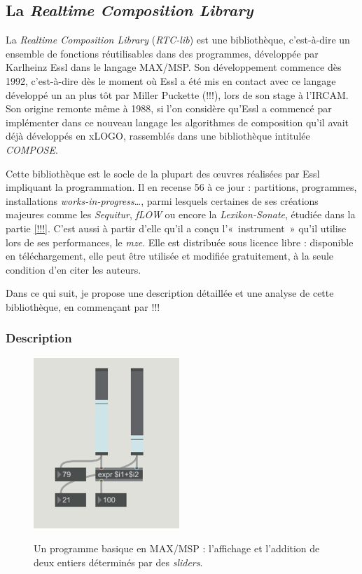 \documentclass[a4paper,12pt]{article}
\newcommand{\guill}[1]{«~#1~»}
\newcommand{\maze}[0]{\emph{m\symbol{64}ze\textdegree2}}
\begin{document}
\subsection{La \emph{Realtime Composition Library}}

La \emph{Realtime Composition Library} (\emph{RTC-lib}) est une bibliothèque, c'est-à-dire un ensemble de fonctions réutilisables dans des programmes, développée par Karlheinz Essl dans le langage MAX/MSP. Son développement commence dès 1992, c'est-à-dire dès le moment où Essl a été mis en contact avec ce langage développé un an plus tôt par Miller Puckette (!!!), lors de son stage à l'IRCAM. Son origine remonte même à 1988, si l'on considère qu'Essl a commencé par implémenter dans ce nouveau langage les algorithmes de composition qu'il avait déjà développés en xLOGO, rassemblés dans une bibliothèque intitulée \emph{COMPOSE}.

Cette bibliothèque est le socle de la plupart des œuvres réalisées par Essl impliquant la programmation. Il en recense 56 à ce jour : partitions, programmes, installations \emph{works-in-progress}\dots, parmi lesquels certaines de ses créations majeures comme les \emph{Sequitur}, \emph{fLOW} ou encore la \emph{Lexikon-Sonate}, étudiée dans la partie \ref{!!!}. C'est aussi à partir d'elle qu'il a conçu l'\guill{instrument} qu'il utilise lors de ses performances, le \maze. Elle est distribuée sous licence libre : disponible en téléchargement, elle peut être utilisée et modifiée gratuitement, à la seule condition d'en citer les auteurs.

Dans ce qui suit, je propose une description détaillée et une analyse de cette bibliothèque, en commençant par !!!

\subsubsection{Description}

\begin{figure}[h!]
\centering
\includegraphics[width=5.5cm]{images/MAXbase.png}
\label{maxmsp}
\caption{\footnotesize Un programme basique en MAX/MSP : l'affichage et l'addition de deux entiers déterminés par des \emph{sliders}.}
\end{figure}
\end{document}
